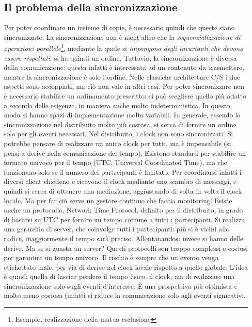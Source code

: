 \subsection{Il problema della sincronizzazione}
Per poter coordinare un insieme di copie, è necessario quindi che queste siano sincronizzate. La sincronizzazione non
è nient'altro che la \textit{sequenzializzazione di operazioni parallele}\footnote{Esempio, realizzazione della mutua
esclusione}, mediante la quale si \textit{impongono degli invarianti che devono essere rispettati}: si ha quindi un
ordine.
Tuttavia, la sincronizzazione è diversa dalla comunicazione: questa infatti è interessata ad un contenuto da
trasmettere, mentre la sincronizzazione è solo l'ordine. Nelle classiche architetture C/S i due aspetti sono accoppiati,
ma ciò non vale in altri casi.
Per poter sincronizzare non è necessario stabilire un ordinamento prescritto: si può scegliere quello più adatto a
seconda delle esigenze, in maniera anche molto indeterministica. In questo modo si hanno spazi di implementazione
molto variabili. In generale, essendo la sincronizzazione nel distribuito molto più costosa, si cerca di fornire un
ordine solo per gli eventi necessari.
Nel distribuito, i clock non sono sincronizzati. Si potrebbe pensare di realizzare un unico clock per tutti, ma è
impensabile (si pensi a derive nella comunicazione del tempo). Esistono standard per stabilire un formato univoco per
il tempo (UTC, Universal Coordinated Time), ma che funzionano solo se il numero dei partecipanti è limitato. Per
coordinarsi infatti i diversi client chiedono e ricevono il clock mediante uno scambio di messaggi, e quindi si cerca
di ottenere una mediazione, aggiustando di volta in volta il clock locale. Ma per far ciò serve un gestore continuo
che faccia monitoring!
Esiste anche un protocollo, Network Time Protocol, definito per il distribuito, in grado di basarsi su UTC per fornire
un tempo comune a tutti i partecipanti.
Si realizza una gerarchia di server, che coinvolge tutti i partecipanti: più si è vicini alla radice, maggiormente il
tempo sarà preciso. Allontanandosi invece si hanno delle derive. Ma se si guasta un server?
Questi protocolli son troppo complessi e costosi per garantire un tempo univoco. Il rischio è sempre che un evento venga
etichettato male, per via di derive nel clock locale rispetto a quello globale. L'idea è quindi quella di lasciar
perdere il tempo fisico, il clock, ma di realizzare una sincronizzazione solo sugli eventi d'interesse. È una
prospettiva più ottimista e molto meno costosa (infatti si riduce la comunicazione solo agli eventi signicativi,
